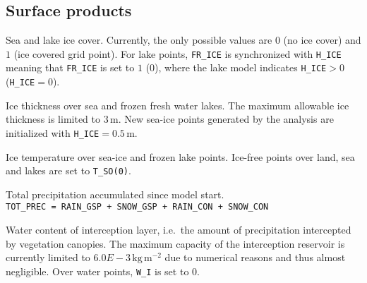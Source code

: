 \subsection{Surface products}
\begin{description}[leftmargin=3.0cm,style=sameline]

 \item [FR\_ICE] Sea and lake ice cover. Currently, the only possible values are $0$ (no ice cover) and $1$ (ice covered grid point). For 
                 lake points, \texttt{FR\_ICE} is synchronized with \texttt{H\_ICE} meaning that \texttt{FR\_ICE} is set to $1$ ($0$), 
                 where the lake model indicates \texttt{H\_ICE}$>0$ (\texttt{H\_ICE}$=0$).

 \item [H\_ICE] Ice thickness over sea and frozen fresh water lakes. The maximum allowable ice thickness is limited to $3\,\mathrm{m}$. 
                New sea-ice points generated by the analysis are initialized with \texttt{H\_ICE}$=0.5\,\mathrm{m}$.

 \item [T\_ICE] Ice temperature over sea-ice and frozen lake points. Ice-free points over land, sea and lakes are set to \texttt{T\_SO(0)}.

 \item [TOT\_PREC] Total precipitation accumulated since model start.\\
                \texttt{TOT\_PREC = RAIN\_GSP + SNOW\_GSP + RAIN\_CON + SNOW\_CON}
                
 \item [W\_I]   Water content of interception layer, i.e.\ the amount of precipitation intercepted by vegetation canopies. The maximum 
                capacity of the interception reservoir is currently limited to $6.0E-3\,\mathrm{kg\,m^{-2}}$ due to numerical reasons 
                and thus almost negligible. Over water points, \texttt{W\_I} is set to 0.
\end{description}


